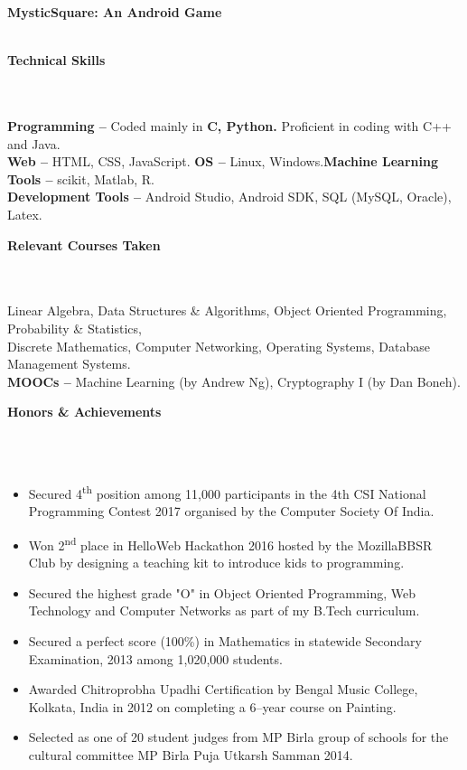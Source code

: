 \documentclass[a4paper,10pt]{article}
\newcommand{\lsep}{-0.5cm}
\newcommand{\resheading}[1]{{\large \colorbox{mygrey}{\begin{minipage}{0.99\textwidth}{\textbf{#1 \vphantom{p\^{E}}}}\end{minipage}}}}
\begin{document}
\indent\textbf{MysticSquare: An Android Game}\\
\\


\resheading{\textbf{Technical Skills} }\\\\[\lsep]

\indent\textbf{Programming -- }Coded mainly in \textbf{C, Python.} Proficient in coding with C++ and Java.\\
\indent\textbf{Web -- } HTML, CSS, JavaScript. \indent\indent\textbf{OS -- } Linux, Windows.\indent\indent\textbf{Machine Learning Tools --} scikit, Matlab, R.\\
\indent\textbf{Development Tools --} Android Studio, Android SDK, SQL (MySQL, Oracle), Latex.\\


\resheading{\textbf{Relevant Courses Taken} }\\\\[\lsep]

\indent Linear Algebra, Data Structures \& Algorithms, Object Oriented Programming, Probability \& Statistics,\\
\indent Discrete Mathematics, Computer Networking, Operating Systems, Database Management Systems.\\
\indent\textbf{MOOCs -- }Machine Learning (by Andrew Ng), Cryptography I (by Dan Boneh).\\


\resheading{\textbf{Honors \& Achievements}}\\[\lsep]\\[-0.2cm]

\begin{itemize}
\item {Secured 4\textsuperscript{th} position among 11,000 participants in the 4th CSI National Programming Contest 2017 organised by the Computer Society Of India.}\\[-0.5cm]
\item {Won 2\textsuperscript{nd} place in HelloWeb Hackathon 2016 hosted by the MozillaBBSR Club by designing a teaching kit to introduce kids to programming.}\\[-0.5cm]
\item {Secured the highest grade "O" in Object Oriented Programming, Web Technology and Computer Networks as part of my B.Tech curriculum. }\\[-0.5cm]
\item {Secured a perfect score (100\%) in Mathematics in statewide Secondary Examination, 2013 among 1,020,000 students.}\\[-0.5cm]
\item {Awarded Chitroprobha Upadhi Certification by Bengal Music College, Kolkata, India in 2012 on completing a 6--year course on Painting.}\\[-0.5cm]
\item{Selected as one of 20 student judges from MP Birla group of schools for the cultural committee MP Birla Puja Utkarsh Samman 2014.}
\end{itemize}
\end{document}

